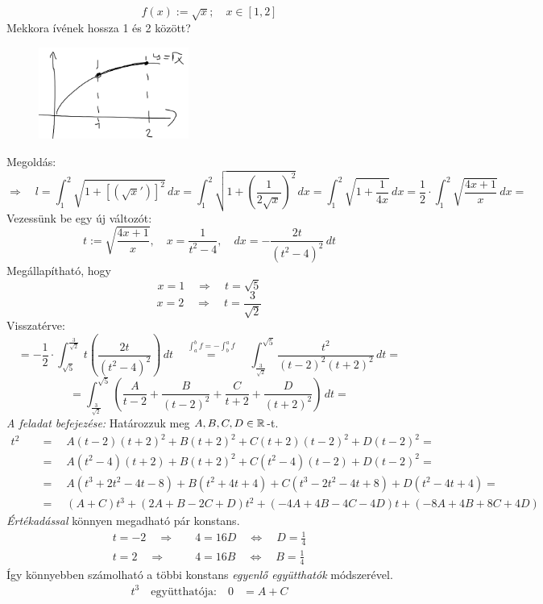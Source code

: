 \documentclass[a4paper,11.5pt]{article}
\begin{document}
	\begin{exercise}
		\[ f(x):=\sqrt{x};\quad x\in[1,2] \]
		Mekkora ívének hossza 1 és 2 között?
		\begin{figure}[H]
			\centering
			\includegraphics[height=3cm]{kepek/12.png}
			\caption{}
		\end{figure}
		Megoldás:
		\[ \Rightarrow\quad l=\int_1^2\sqrt{1+\left[(\sqrt{x}')\right]^2}\,dx=\int_1^2\sqrt{1+\left(\frac{1}{2\sqrt{x}}\right)^2}\,dx=\int_1^2\sqrt{1+\frac{1}{4x}}\,dx=\frac{1}{2}\cdot\int_1^2\sqrt{\frac{4x+1}{x}}\,dx= \]
		Vezessünk be egy új változót:
		\[ t:=\sqrt{\frac{4x+1}{x}},\quad x=\frac{1}{t^2-4},\quad dx=-\frac{2t}{(t^2-4)^2}\,dt\]
		Megállapítható, hogy 
		\[ x=1\quad \Rightarrow\quad t=\sqrt{5} \]
		\[ x=2\quad \Rightarrow\quad t=\frac{3}{\sqrt{2}} \]
		Visszatérve:
		\[ =-\frac{1}{2}\cdot\int_{\sqrt{5}}^{\frac{3}{\sqrt{2}}}t\left(\frac{2t}{(t^2-4)^2}\right)\,dt\quad \overset{\int_a^bf=-\int_b^af}{=}\quad \int_{\frac{3}{\sqrt{2}}}^{\sqrt{5}}\frac{t^2}{(t-2)^2(t+2)^2}\,dt=\]
		\[=\int_{\frac{3}{\sqrt{2}}}^{\sqrt{5}}\left(\frac{A}{t-2}+\frac{B}{(t-2)^2}+\frac{C}{t+2}+\frac{D}{(t+2)^2}\right)\,dt=\]
		\textit{A feladat befejezése:} Határozzuk meg $A,B,C,D\in\mathbb{R}$-t.
		\begin{align*}
			t^2\quad &=\quad A(t-2)(t+2)^2+B(t+2)^2+C(t+2)(t-2)^2+D(t-2)^2=\\
					 &=\quad A(t^2-4)(t+2)+B(t+2)^2+C(t^2-4)(t-2)+D(t-2)^2=\\
					 &=\quad A(t^3+2t^2-4t-8)+B(t^2+4t+4)+C(t^3-2t^2-4t+8)+D(t^2-4t+4)=\\
					 &=\quad (A+C)t^3+(2A+B-2C+D)t^2+(-4A+4B-4C-4D)t+(-8A+4B+8C+4D)
		\end{align*}
		\textit{Értékadással} könnyen megadható pár konstans.
		\begin{align*}
		t=-2\quad \Rightarrow&\quad 4=16D\quad \Leftrightarrow\quad D=\frac{1}{4}\\
		t=2\quad \Rightarrow &\quad 4=16B\quad \Leftrightarrow\quad B=\frac{1}{4}
		\end{align*}
		Így könnyebben számolható a többi konstans \textit{egyenlő együtthatók} módszerével.
		\begin{align*}
			t^3 \quad \text{együtthatója:}\quad 0&=A+C\\

\end{align*}
\end{exercise}
\end{document}
